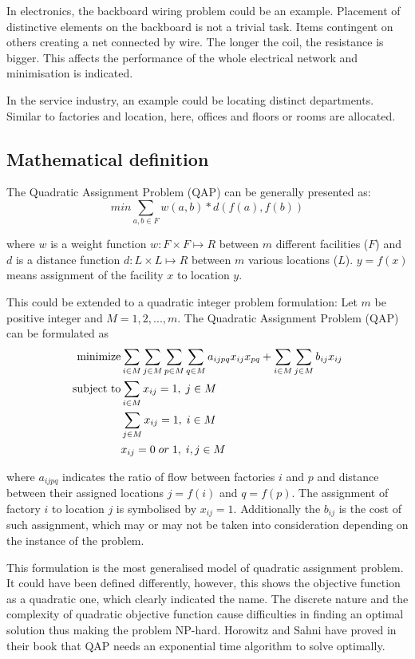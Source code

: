 In electronics, the backboard wiring problem could be an example.
Placement of distinctive elements on the backboard is not a trivial task.
Items contingent on others creating a net connected by wire.
The longer the coil, the resistance is bigger.
This affects the performance of the whole electrical network and minimisation is indicated.

In the service industry, an example could be locating distinct departments.
Similar to factories and location, here, offices and floors or rooms are allocated.

\subsection{Mathematical definition}
The Quadratic Assignment Problem (QAP) can be generally presented as:
\begin{equation}
min \sum_{a, b \in F} w(a, b) * d( f(a), f(b))
\end{equation}

where $w$ is a weight function $w: F \times F \mapsto R$ between $m$ different facilities ($F$) and $d$ is a distance function $d: L \times L \mapsto R$ between $m$ various locations ($L$). $y = f(x)$ means assignment of the facility $x$ to location $y$.

This could be extended to a quadratic integer problem formulation:
Let $m$ be positive integer and $M = { 1, 2, ..., m }$. The Quadratic Assignment Problem (QAP) can be formulated as
\begin{align}
  \text{minimize} &\null \sum_{i \in M} \sum_{j \in M} \sum_{p \in M} \sum_{q \in M} a_{ijpq}x_{ij}x_{pq} + \sum_{i \in M} \sum_{j \in M} b_{ij} x_{ij} \\
  \text{subject to} &\null \sum_{i \in M} x_{ij} = 1, \; j \in M \\
  &\null \sum_{j \in M} x_{ij} = 1, \; i \in M \\
  &\null x_{ij} = 0 \; or \; 1, \; i, j \in M
\end{align}

where $a_{ijpq}$ indicates the ratio of flow between factories $i$ and $p$ and distance between their assigned locations $j = f(i)$ and $q = f(p)$.
The assignment of factory $i$ to location $j$ is symbolised by $x_{ij} = 1$.
Additionally the $b_{ij}$ is the cost of such assignment, which may or may not be taken into consideration depending on the instance of the problem.

This formulation is the most generalised model of quadratic assignment problem.
It could have been defined differently, however, this shows the objective function as a quadratic one, which clearly indicated the name.
The discrete nature and the complexity of quadratic objective function cause difficulties in finding an optimal solution thus making the problem NP-hard.
Horowitz and Sahni have proved in their book \cite{horowitz1978fundamentals} that QAP needs an exponential time algorithm to solve optimally.


